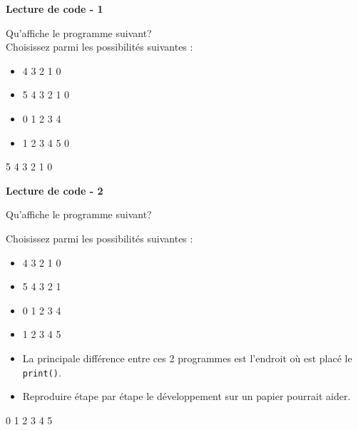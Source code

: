 \begin{Exercice}[5 minutes] \textbf{Lecture de code - 1} 
	
	Qu'affiche le programme suivant? \\ 
	
	 
	
	Choisissez parmi les possibilités suivantes : \\
	
	\begin{itemize}
	\item 4  
	3 
	2 
	1 
	0 
	\item 5 
	4 
	3 
	2 
    1 
    0
	\item 0 
	1 
	2 
	3 
	4 
	\item 1 
	2 
	3 
	4
    5
    0
    \end{itemize}
    \begin{solution} 
			5  
			4  
			3  
			2  
			1  
			0  
		\end{solution} 
    
\end{Exercice}

\begin{Exercice}[5 minutes] \textbf{Lecture de code - 2}
    
	Qu'affiche le programme suivant?
	
	
	Choisissez parmi les possibilités suivantes : \\
	
	\begin{itemize}
	\item 4  
	3 
	2 
	1 
	0 
	\item 5 
	4 
	3 
	2 
	1 
	\item 0 
	1 
	2 
	3 
	4 
	\item 1 
	2 
	3 
	4 
	5
	\end{itemize}
	
	 
	
		\begin{conseil} 
		\begin{itemize} 
			\item La principale différence entre ces 2 programmes est l'endroit où est placé le \lstinline{print()}. 
			\item Reproduire étape par étape le développement sur un papier pourrait aider. 
		\end{itemize} 
		\end{conseil} 
	
		\begin{solution} 
			0  
			1  
			2  
			3  
			4  
			5 
	
		\end{solution} 
	
\end{Exercice}

